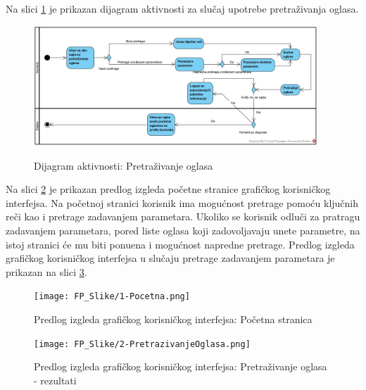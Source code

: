\documentclass[20pt]{article}
\begin{document}
\setlength{\parindent}{1cm}
\fontsize{13}{18} \selectfont 

Na slici \ref{fig:dijagramAktivnostiPretrazivanjeOglasa} je prikazan dijagram aktivnosti za slu\v{c}aj upotrebe pretra\v {z}ivanja oglasa.

\begin{figure}[h]
        \centering
        \includegraphics[width=0.95\textwidth,height=0.49\textheight]{Pictures/PretrazivanjeOglasa}\\
        \caption{Dijagram aktivnosti: Pretra\v {z}ivanje oglasa}
        \label{fig:dijagramAktivnostiPretrazivanjeOglasa}
    \end{figure}

\newpage
{}
\setlength{\parindent}{1cm}
\fontsize{13}{18} \selectfont 
Na slici \ref{fig:guiPretrazivanjeOglasa} je prikazan predlog izgleda po\v cetne stranice grafi\v ckog korisni\v ckog interfejsa. Na po\v cetnoj stranici korisnik ima mogu\' cnost pretrage pomo\' cu klju\v cnih re\v ci kao i pretrage zadavanjem parametara. Ukoliko se korisnik odlu\v ci za pratragu zadavanjem parametara, pored liste oglasa koji zadovoljavaju unete parametre, na istoj stranici \' ce mu biti ponu\dj ena i mogu\' cnost napredne pretrage. Predlog izgleda grafi\v ckog korisni\v ckog interfejsa u slu\v caju pretrage zadavanjem parametara je prikazan na slici \ref{fig:guiPretrazivanjeOglasaRez}. 

\begin{figure}[h]
        \centering
        \texttt{[image: FP\_Slike/1-Pocetna.png]}\\
        \caption{Predlog izgleda grafi\v ckog korisni\v ckog interfejsa: Po\v cetna stranica}
        \label{fig:guiPretrazivanjeOglasa}
    \end{figure}

\newpage
\begin{figure}[h]
        \centering
        \texttt{[image: FP\_Slike/2-PretrazivanjeOglasa.png]}\\
        \caption{Predlog izgleda grafi\v ckog korisni\v ckog interfejsa: Pretra\v zivanje oglasa - rezultati}
        \label{fig:guiPretrazivanjeOglasaRez}
    \end{figure}
\end{document}
